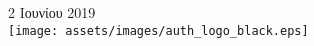 \begin{titlepage}
    
    
    {\large 2 Ιουνίου 2019}\\[2cm] %
    
    
    \texttt{[image: assets/images/auth\_logo\_black.eps]}\\[1cm] %
     
    
    \vfill %
    
    \end{titlepage}
    